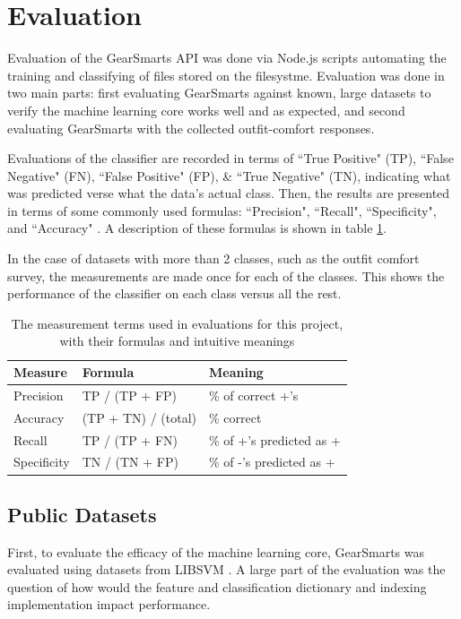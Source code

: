 \section{Evaluation}
\label{section:evaluation}
Evaluation of the GearSmarts API was done via Node.js scripts automating the training and classifying of files
stored on the filesystme. Evaluation was done in two main parts: first evaluating GearSmarts against known, large datasets
to verify the machine learning core works well and as expected, and second evaluating GearSmarts with the collected
outfit-comfort responses.

Evaluations of the classifier are recorded in terms of ``True Positive" (TP), ``False Negative" (FN), ``False Positive"
(FP), \& ``True Negative" (TN), indicating what was predicted verse what the data's actual class. Then, the results are
presented in terms of some commonly used formulas: ``Precision", ``Recall", ``Specificity", and ``Accuracy"
\cite{measures}. A description of these formulas is shown in table \ref{table:measures}.

In the case of datasets with more than 2 classes, such as the outfit comfort survey, the measurements are made once for
each of the classes. This shows the performance of the classifier on each class versus all the rest.

\begin{table}
    \begin{tabular}{lll}
        \hline
        \textbf{Measure} & \textbf{Formula} & \textbf{Meaning} \\ [0.5ex]
        \hline\hline
        Precision	& TP / (TP + FP) & \% of correct +'s \\
        Accuracy	& (TP + TN) / (total) & \% correct \\
        Recall 	    & TP / (TP + FN) & \% of +'s predicted as + \\
        Specificity	& TN / (TN + FP) & \% of -'s predicted as + \\
        \hline
    \end{tabular}
    \caption{The measurement terms used in evaluations for this project, with their formulas and intuitive meanings}
    \label{table:measures}
\end{table}

\subsection{Public Datasets}
\label{subsection:publicdatasets}
First, to evaluate the efficacy of the machine learning core, GearSmarts was evaluated using datasets from LIBSVM \cite{libsvm:datasets}.
A large part of the evaluation was the question of how would the feature and classification dictionary and indexing implementation
impact performance.

